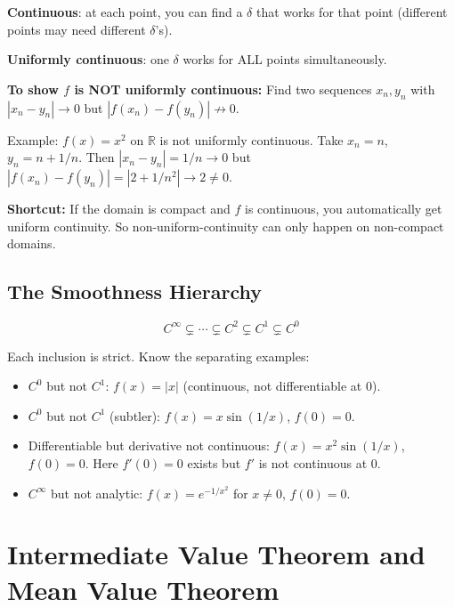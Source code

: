 \documentclass[11pt]{article}
\newcommand{\R}{\mathbb{R}}
\theoremstyle{definition}
\begin{document}
\begin{intuition}
\textbf{Continuous}: at each point, you can find a $\delta$ that works for that point (different points may need different $\delta$'s).

\textbf{Uniformly continuous}: one $\delta$ works for ALL points simultaneously.
\end{intuition}

\begin{application}
\textbf{To show $f$ is NOT uniformly continuous:} Find two sequences $x_n, y_n$ with $|x_n - y_n| \to 0$ but $|f(x_n) - f(y_n)| \not\to 0$.

Example: $f(x) = x^2$ on $\R$ is not uniformly continuous. Take $x_n = n$, $y_n = n + 1/n$. Then $|x_n - y_n| = 1/n \to 0$ but $|f(x_n) - f(y_n)| = |2 + 1/n^2| \to 2 \neq 0$.

\textbf{Shortcut:} If the domain is compact and $f$ is continuous, you automatically get uniform continuity. So non-uniform-continuity can only happen on non-compact domains.
\end{application}

\subsection{The Smoothness Hierarchy}

$$C^\infty \subsetneq \cdots \subsetneq C^2 \subsetneq C^1 \subsetneq C^0$$

Each inclusion is strict. Know the separating examples:
\begin{itemize}
\item $C^0$ but not $C^1$: $f(x) = |x|$ (continuous, not differentiable at $0$).
\item $C^0$ but not $C^1$ (subtler): $f(x) = x \sin(1/x)$, $f(0) = 0$.
\item Differentiable but derivative not continuous: $f(x) = x^2 \sin(1/x)$, $f(0) = 0$. Here $f'(0) = 0$ exists but $f'$ is not continuous at $0$.
\item $C^\infty$ but not analytic: $f(x) = e^{-1/x^2}$ for $x \neq 0$, $f(0) = 0$.
\end{itemize}

\section{Intermediate Value Theorem and Mean Value Theorem}
\end{document}
